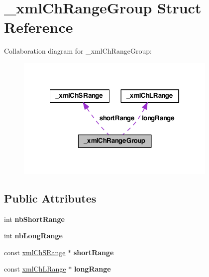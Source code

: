 \hypertarget{struct__xml_ch_range_group}{\section{\-\_\-xml\-Ch\-Range\-Group Struct Reference}
\label{struct__xml_ch_range_group}
}


Collaboration diagram for \-\_\-xml\-Ch\-Range\-Group\-:
\nopagebreak
\begin{figure}[H]
\begin{center}
\leavevmode
\includegraphics[width=273pt]{struct__xml_ch_range_group__coll__graph}
\end{center}
\end{figure}
\subsection*{Public Attributes}
\begin{DoxyCompactItemize}
\item 
\hypertarget{struct__xml_ch_range_group_a586ec6ff0df5781a799120268c917581}{int {\bfseries nb\-Short\-Range}}\label{struct__xml_ch_range_group_a586ec6ff0df5781a799120268c917581}

\item 
\hypertarget{struct__xml_ch_range_group_a8c00ae5937f0d5489444fd8c264f7640}{int {\bfseries nb\-Long\-Range}}\label{struct__xml_ch_range_group_a8c00ae5937f0d5489444fd8c264f7640}

\item 
\hypertarget{struct__xml_ch_range_group_ab437c33acae9b5d5d2bc8ef547baf6fe}{const \hyperlink{struct__xml_ch_s_range}{xml\-Ch\-S\-Range} $\ast$ {\bfseries short\-Range}}\label{struct__xml_ch_range_group_ab437c33acae9b5d5d2bc8ef547baf6fe}

\item 
\hypertarget{struct__xml_ch_range_group_a16b89c83778fd557add093f4235cb976}{const \hyperlink{struct__xml_ch_l_range}{xml\-Ch\-L\-Range} $\ast$ {\bfseries long\-Range}}\label{struct__xml_ch_range_group_a16b89c83778fd557add093f4235cb976}

\end{DoxyCompactItemize}


